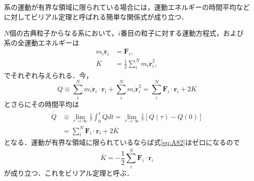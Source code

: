 系の運動が有界な領域に限られている場合には，運動エネルギーの時間平均などに対してビリアル定理と呼ばれる簡単な関係式が成り立つ．

$N$個の古典粒子からなる系において，$i$番目の粒子に対する運動方程式，および系の全運動エネルギーは
\begin{align}
	m_i \ddot{\bm{r}}_i &= \bm{F}_i, \\
	K &= \frac{1}{2} \sum_{i}^{N} m_i \dot{\bm{r}}_i^2,
\end{align}
でそれぞれ与えられる．今，
\begin{equation}
	Q \equiv \sum_{i}^{N} m_i \ddot{\bm{r}}_i \cdot \bm{r}_i + \sum_{i}^{N} m_i \dot{\bm{r}}_i^2 = \sum_{i}^{N} \bm{F}_i \cdot \bm{r}_i + 2K
\end{equation}
とさらにその時間平均は
\begin{align}
	\overline{\dot{Q}} &\equiv \lim_{\tau \rightarrow \infty} \frac{1}{\tau} \int_0^\tau \dot{Q} dt = \lim_{\tau \rightarrow \infty} \frac{1}{\tau} [Q(\tau) - Q(0)] \label{eq:A82}\\
	&= \sum_{i}^{N} \bm{F}_i\cdot\bm{r}_i + 2 \overline{K}
\end{align}
となる．運動が有界な領域に限られているならば式\eqref{eq:A82}はゼロになるので
\begin{equation}
	\overline{K} = -\frac{1}{2} \overline{\sum_{i}^{N} \bm{F}_i \cdot \bm{r}_i} \label{eq:A84}
\end{equation}
が成り立つ．これをビリアル定理と呼ぶ．

